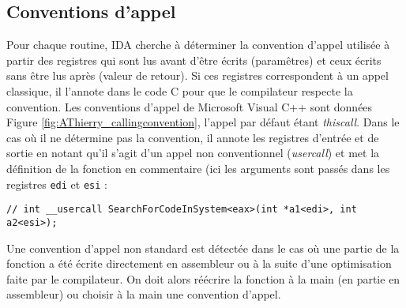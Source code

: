 \documentclass[times,11pt,fullpage]{article}
\newenvironment{changemargin}[2]{\begin{list}{}{%
\setlength{\topsep}{0pt}%
\setlength{\leftmargin}{0pt}%
\setlength{\rightmargin}{0pt}%
\setlength{\listparindent}{\parindent}%
\setlength{\itemindent}{\parindent}%
\setlength{\parsep}{0pt plus 1pt}%
\addtolength{\leftmargin}{#1}%
\addtolength{\rightmargin}{#2}%
}\item }{\end{list}}
\begin{document}
% 
% 
  

\subsection{Conventions d'appel}

Pour chaque routine, IDA cherche à déterminer la convention d'appel utilisée à partir des registres qui sont lus avant d'être écrits (paramêtres) et ceux écrits sans être lus après (valeur de retour). Si ces registres correspondent à un appel classique, il l'annote dans le code C pour que le compilateur respecte la convention. Les conventions d'appel de Microsoft Visual C++ sont données Figure \ref{fig:AThierry_callingconvention}, l'appel par défaut étant \emph{thiscall}. Dans le cas où il ne détermine pas la convention, il annote les registres d'entrée et de sortie en notant qu'il s'agit d'un appel non conventionnel (\emph{usercall}) et met la définition de la fonction en commentaire (ici les arguments sont passés dans les registres \texttt{edi} et \texttt{esi} :
\begin{verbatim}
// int __usercall SearchForCodeInSystem<eax>(int *a1<edi>, int a2<esi>);
\end{verbatim}
Une convention d'appel non standard est détectée dans le cas où une partie de la fonction a été écrite directement en assembleur ou à la suite d'une optimisation faite par le compilateur. On doit alors réécrire la fonction à la main (en partie en assembleur) ou choisir à la main une 
convention d'appel.
\end{document}

